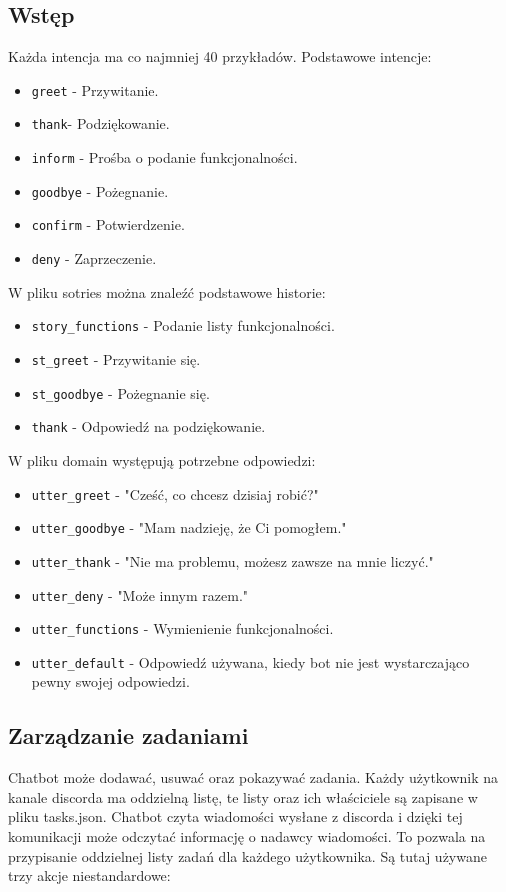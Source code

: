 \documentclass{article}
\begin{document}
\subsection{Wstęp}
Każda intencja ma co najmniej 40 przykładów. Podstawowe intencje:
\begin{itemize}
    \item \verb|greet| - Przywitanie.
    \item \verb|thank|- Podziękowanie.
    \item \verb|inform| - Prośba o podanie funkcjonalności.
    \item \verb|goodbye| - Pożegnanie.
    \item \verb|confirm| - Potwierdzenie.
    \item \verb|deny| - Zaprzeczenie.
\end{itemize}
W pliku sotries można znaleźć podstawowe historie:
\begin{itemize}
    \item \verb|story_functions| - Podanie listy funkcjonalności.
    \item \verb|st_greet| - Przywitanie się.
    \item \verb|st_goodbye| - Pożegnanie się.
    \item \verb|thank| - Odpowiedź na podziękowanie.
\end{itemize}
W pliku domain występują potrzebne odpowiedzi:
\begin{itemize}
    \item \verb|utter_greet| - "Cześć, co chcesz dzisiaj robić?"
    \item \verb|utter_goodbye| - "Mam nadzieję, że Ci pomogłem."
    \item \verb|utter_thank| - "Nie ma problemu, możesz zawsze na mnie liczyć."
    \item \verb|utter_deny| - "Może innym razem."
    \item \verb|utter_functions| - Wymienienie funkcjonalności.
    \item \verb|utter_default| - Odpowiedź używana, kiedy bot nie jest
        wystarczająco pewny swojej odpowiedzi.
\end{itemize}
\subsection{Zarządzanie zadaniami}
Chatbot może dodawać, usuwać oraz pokazywać zadania. Każdy użytkownik na kanale
discorda ma oddzielną listę, te listy oraz ich właściciele są zapisane w pliku
tasks.json. Chatbot czyta wiadomości wysłane z discorda i dzięki tej
komunikacji może odczytać informację o nadawcy wiadomości. To pozwala na
przypisanie oddzielnej listy zadań dla każdego użytkownika. Są tutaj używane
trzy akcje niestandardowe:
\end{document}
